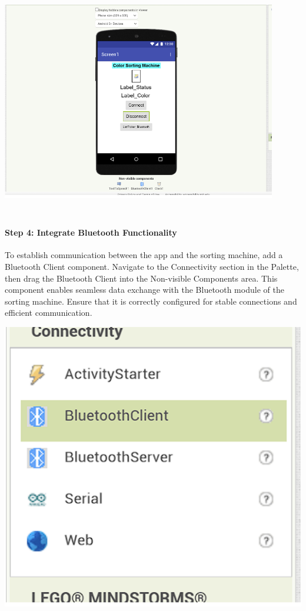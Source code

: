 \documentclass[conference, onecolumn]{IEEEtran}
\begin{document}
\begin{center}
    \includegraphics[height=10cm, width=0.9\textwidth]{IOT Design the User Interface.png}
    \label{fig1}
    \end{center}
    \vspace{3em}
\noindent


\paragraph{Step 4: Integrate Bluetooth Functionality}  
To establish communication between the app and the sorting machine, add a Bluetooth Client component. Navigate to the Connectivity section in the Palette, then drag the Bluetooth Client into the Non-visible Components area. This component enables seamless data exchange with the Bluetooth module of the sorting machine. Ensure that it is correctly configured for stable connections and efficient communication.

\begin{center} 
    \includegraphics[width=0.4\linewidth]{The Non-visible Components area.png}
    \label{fig1}
    \end{center}
    \vspace{3em}
\noindent
\end{document}

